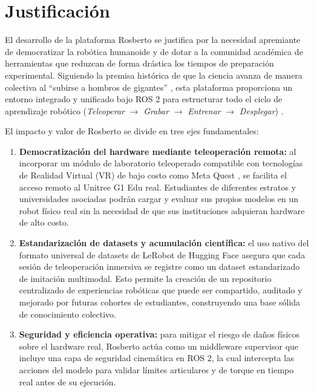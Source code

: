 \documentclass[stu,12pt,floatsintext]{apa7}
\begin{document}
\section{Justificación}

El desarrollo de la plataforma Rosberto se justifica por la necesidad apremiante de democratizar la robótica humanoide y de dotar a la comunidad académica de herramientas que reduzcan de forma drástica los tiempos de preparación experimental. Siguiendo la premisa histórica de que la ciencia avanza de manera colectiva al ``subirse a hombros de gigantes'' \parencite{newton1687}, esta plataforma proporciona un entorno integrado y unificado bajo ROS 2 para estructurar todo el ciclo de aprendizaje robótico (\textit{Teleoperar} $\rightarrow$ \textit{Grabar} $\rightarrow$ \textit{Entrenar} $\rightarrow$ \textit{Desplegar}) \parencite{cadene2026lerobotopensourcelibraryendtoend}.

El impacto y valor de Rosberto se divide en tres ejes fundamentales:
\begin{enumerate}
    \item \textbf{Democratización del hardware mediante teleoperación remota:} al incorporar un módulo de laboratorio teleoperado compatible con tecnologías de Realidad Virtual (VR) de bajo costo como Meta Quest \parencite{phosphobot2024}, se facilita el acceso remoto al Unitree G1 Edu real. Estudiantes de diferentes estratos y universidades asociadas podrán cargar y evaluar sus propios modelos en un robot físico real sin la necesidad de que sus instituciones adquieran hardware de alto costo.
    \item \textbf{Estandarización de datasets y acumulación científica:} el uso nativo del formato universal de datasets de LeRobot de Hugging Face \parencite{cadene2026lerobotopensourcelibraryendtoend} asegura que cada sesión de teleoperación inmersiva se registre como un dataset estandarizado de imitación multimodal. Esto permite la creación de un repositorio centralizado de experiencias robóticas que puede ser compartido, auditado y mejorado por futuras cohortes de estudiantes, construyendo una base sólida de conocimiento colectivo.
    \item \textbf{Seguridad y eficiencia operativa:} para mitigar el riesgo de daños físicos sobre el hardware real, Rosberto actúa como un middleware supervisor que incluye una capa de seguridad cinemática en ROS 2, la cual intercepta las acciones del modelo para validar límites articulares y de torque en tiempo real antes de su ejecución.
\end{enumerate}
\end{document}
